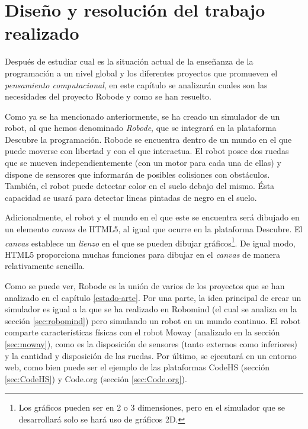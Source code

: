 \chapter{Diseño y resolución del trabajo realizado}
\label{diseno}

Después de estudiar cual es la situación actual de la enseñanza de la programación a un nivel global y los diferentes proyectos que promueven el \emph{pensamiento computacional}, en este capítulo se analizarán cuales son las necesidades del proyecto Robode y como se han resuelto.

Como ya se ha mencionado anteriormente, se ha creado un simulador de un robot, al que hemos denominado \emph{Robode}, que se integrará en la plataforma Descubre la programación. Robode se encuentra dentro de un mundo en el que puede moverse con libertad y con el que interactua. El robot posee dos ruedas que se mueven independientemente (con un motor para cada una de ellas) y dispone de sensores que informarán de posibles colisiones con obstáculos. También, el robot puede detectar color en el suelo debajo del mismo. Ésta capacidad se usará para detectar lineas pintadas de negro en el suelo.

Adicionalmente, el robot y el mundo en el que este se encuentra será dibujado en un elemento \emph{canvas} de HTML5, al igual que ocurre en la plataforma Descubre. El \emph{canvas} establece un \emph{lienzo} en el que se pueden dibujar gráficos\footnote{Los gráficos pueden ser en 2 o 3 dimensiones, pero en el simulador que se desarrollará solo se hará uso de gráficos 2D.}. De igual modo, HTML5 proporciona muchas funciones para dibujar en el \emph{canvas} de manera relativamente sencilla.


Como se puede ver, Robode es la unión de varios de los proyectos que se han analizado en el capítulo \ref{estado-arte}. Por una parte, la idea principal de crear un simulador es igual a la que se ha realizado en Robomind (el cual se analiza en la sección \ref{sec:robomind}) pero simulando un robot en un mundo continuo. El robot comparte características físicas con el robot Moway (analizado en la sección \ref{sec:moway}), como es la disposición de sensores (tanto externos como inferiores) y la cantidad y disposición de las ruedas. Por último, se ejecutará en un entorno web, como bien puede ser el ejemplo de las plataformas CodeHS (sección \ref{sec:CodeHS}) y Code.org (sección \ref{sec:Code.org}). 


